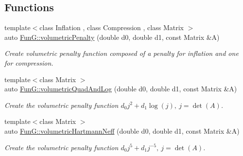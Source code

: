 \subsection*{Functions}
\begin{DoxyCompactItemize}
\item 
{\footnotesize template$<$class Inflation , class Compression , class Matrix $>$ }\\auto \hyperlink{namespaceFunG_ad26faeb264bb4b1cd7e70f3811c366c8}{Fun\+G\+::volumetric\+Penalty} (double d0, double d1, const Matrix \&A)
\begin{DoxyCompactList}\small\item\em Create volumetric penalty function composed of a penalty for inflation and one for compression. \end{DoxyCompactList}\item 
{\footnotesize template$<$class Matrix $>$ }\\auto \hyperlink{namespaceFunG_aaf30b9c36ed86e01b94f6b7c1d95cae8}{Fun\+G\+::volumetric\+Quad\+And\+Log} (double d0, double d1, const Matrix \&A)
\begin{DoxyCompactList}\small\item\em Create the volumetric penalty function $ d_0 j^2 + d_1 \log(j),\ j=\det(A) $. \end{DoxyCompactList}\item 
{\footnotesize template$<$class Matrix $>$ }\\auto \hyperlink{namespaceFunG_adf4be5df85ea9df10cc9e11c11aaeb7b}{Fun\+G\+::volumetric\+Hartmann\+Neff} (double d0, double d1, const Matrix \&A)
\begin{DoxyCompactList}\small\item\em Create the volumetric penalty function $ d_0 j^5 + d_1 j^{-5},\ j=\det(A) $. \end{DoxyCompactList}\end{DoxyCompactItemize}
